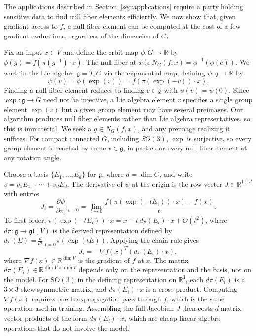 \documentclass[11pt]{article}
\newcommand{\RR}{\mathbb{R}}
\begin{document}
The applications described in Section~\ref{sec:applications} require a party holding sensitive data to find null fiber elements efficiently. We now show that, given gradient access to $f$, a null fiber element can be computed at the cost of a few gradient evaluations, regardless of the dimension of $G$.

Fix an input $x \in V$ and define the orbit map $\phi\colon G \to \RR$ by $\phi(g) = f(\pi(g^{-1}) \cdot x)$. The null fiber at $x$ is $N_G(f, x) = \phi^{-1}(\phi(e))$. We work in the Lie algebra $\mathfrak{g} = T_e G$ via the exponential map, defining $\psi\colon \mathfrak{g} \to \RR$ by
\begin{equation}\label{eq:psi}
    \psi(v) = \phi(\exp(v)) = f(\pi(\exp(-v)) \cdot x).
\end{equation}
Finding a null fiber element reduces to finding $v \in \mathfrak{g}$ with $\psi(v) = \psi(0)$. Since $\exp\colon\mathfrak{g}\to G$ need not be injective, a Lie algebra element $v$ specifies a single group element $\exp(v)$ but a given group element may have several preimages. Our algorithm produces null fiber elements rather than Lie algebra representatives, so this is immaterial. We seek a $g\in N_G(f,x)$, and any preimage realizing it suffices. For compact connected $G$, including $SO(3)$, $\exp$ is surjective, so every group element is reached by some $v\in\mathfrak{g}$, in particular every null fiber element at any rotation angle.

Choose a basis $\{E_1, \ldots, E_d\}$ for $\mathfrak{g}$, where $d = \dim G$, and write $v = v_1 E_1 + \cdots + v_d E_d$. The derivative of $\psi$ at the origin is the row vector $J \in \RR^{1 \times d}$ with entries
\begin{equation}\label{eq:jacobian-entry}
    J_i = \frac{\partial \psi}{\partial v_i}\bigg|_{v=0} = \lim_{t \to 0} \frac{f(\pi(\exp(-tE_i)) \cdot x) - f(x)}{t}.
\end{equation}
To first order, $\pi(\exp(-tE_i)) \cdot x = x - t\, d\pi(E_i) \cdot x + O(t^2)$, where $d\pi\colon \mathfrak{g} \to \mathfrak{gl}(V)$ is the derived representation defined by $d\pi(E) = \frac{d}{dt}\big|_{t=0} \pi(\exp(tE))$. Applying the chain rule gives
\begin{equation}\label{eq:jacobian-formula}
    J_i = -\nabla f(x)^T \left( d\pi(E_i) \cdot x \right),
\end{equation}
where $\nabla f(x) \in \RR^{\dim V}$ is the gradient of $f$ at $x$. The matrix $d\pi(E_i) \in \RR^{\dim V \times \dim V}$ depends only on the representation and the basis, not on the model. For $\mathrm{SO}(3)$ in the defining representation on $\RR^3$, each $d\pi(E_i)$ is a $3 \times 3$ skew-symmetric matrix, and $d\pi(E_i) \cdot x$ is a cross product. Computing $\nabla f(x)$ requires one backpropagation pass through $f$, which is the same operation used in training. Assembling the full Jacobian $J$ then costs $d$ matrix-vector products of the form $d\pi(E_i) \cdot x$, which are cheap linear algebra operations that do not involve the model.
\end{document}
